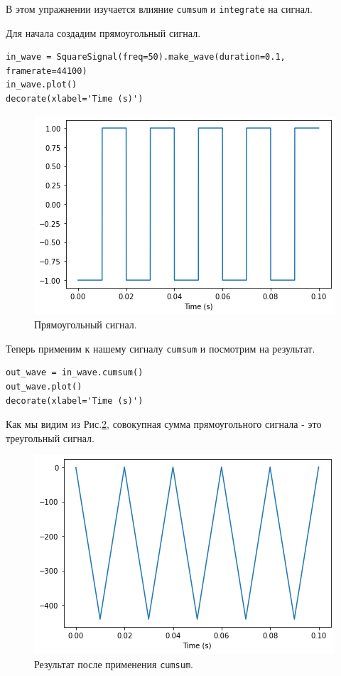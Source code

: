 \documentclass[a4paper, 14pt]{extarticle}
\begin{document}
    В этом упражнении изучается влияние \texttt{cumsum} и \texttt{integrate} на сигнал.

    Для начала создадим прямоугольный сигнал.

    \begin{lstlisting}[caption= Создание прямоугольного сигнала., label={lst:task3_in_square}]
in_wave = SquareSignal(freq=50).make_wave(duration=0.1, framerate=44100)
in_wave.plot()
decorate(xlabel='Time (s)')     \end{lstlisting}

    \begin{figure}[h]
        \centering
        \includegraphics[width=0.8\linewidth]{resources/Images/task3_in_square}
        \caption{Прямоугольный сигнал.}
        \label{fig:task3_in_square}
    \end{figure}

    Теперь применим к нашему сигналу \texttt{cumsum} и посмотрим на результат.

    \begin{lstlisting}[caption= Применение \texttt{cumsum}., label={lst:task3_out_cumsum}]
out_wave = in_wave.cumsum()
out_wave.plot()
decorate(xlabel='Time (s)')     \end{lstlisting}

    Как мы видим из Рис.\ref{fig:task3_out_cumsum}, совокупная сумма прямоугольного сигнала - это треугольный сигнал.

    \begin{figure}[H]
        \centering
        \includegraphics[width=0.7\linewidth]{resources/Images/task3_out_cumsum}
        \caption{Результат после применения \texttt{cumsum}.}
        \label{fig:task3_out_cumsum}
    \end{figure}
\end{document}
